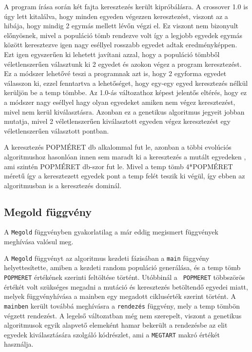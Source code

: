 \documentclass[12pt,a4paper,oneside]{report}
\begin{document}
            A program írása során két fajta keresztezés került kipróbálásra.
            A crossover 1.0 is úgy lett kitalálva, hogy minden egyeden végezzen keresztezést, viszont az a hibája, hogy mindig 2 egymás mellett lévőn végzi el.
            Ez viszont nem bizonyult előnyösnek, mivel a populáció tömb rendezve volt így a legjobb egyedek egymás között keresztezve igen nagy eséllyel rosszabb egyedet adtak eredményképpen.
            Ezt igen egyszerűen ki lehetett javítani azzal, hogy a populáció tömbből véletlenszerűen választunk ki 2 egyedet és azokon végez a program keresztezést.
            Ez a módszer lehetővé teszi a programnak azt is, hogy 2 egyforma egyedet válasszon ki, ezzel fenntartva a lehetőséget, hogy egy-egy egyed keresztezés nélkül kerüljön be a temp tömbbe.
            Az 1.0-ás változathoz képest jelentős eltérés, hogy ez a módszer nagy eséllyel hagy olyan egyedeket amiken nem végez keresztezést, mivel nem kerül kiválasztásra.
            Azonban ez a genetikus algoritmus jegyeit jobban mutatja, mivel 2 véletlenszerűen kiválasztott egyeden végez keresztezést egy véletlenszerűen választott pontban.
            
            
            A keresztezés POPMÉRET db alkalommal fut le, azonban a többi evolúciós algoritmushoz hasonlóan innen sem maradt ki a keresztezés a mutált egyedeken , ami szintén POPMÉRET db-szor fut le.
            Mivel a temp tömb 4*POPMÉRET méretű így a keresztezett egyedek pont a temp felét teszik ki végül, így ebben az algoritmusban is a keresztezés dominál.

        \subsection{Megold függvény} %
            	A \texttt{Megold} függvényben gyakorlatilag a már eddig megismert függvények meghívása valósul meg.
	
	A \texttt{Megold} függvényt az algoritmus kezdeti fázisában a  \texttt{main} függvény helyettesítette, amiben a kezdeti random populáció generálása, és a temp tömb\texttt{ POPMERET} értékének szerinti feltöltése történt. Utóbbinál a \texttt{ POPMERET} többszörös értékét volt szükséges megadni a mutáció és keresztezés betöltendő egyedei miatt, melyek függvényhívása a mainben egy megadott ciklusérték szerint történt. A  \texttt{mainben} került továbbá meghívásra a \texttt{rendezés} függvény, mely a temp tömbön végzett rendezést. A legelső változatban még nem szerepelt, viszont a genetikus algoritmusok egyik alapvető elemeként hamar bekerült a rendezésbe az elit egyedek kiválasztására szolgáló kódrészlet, ami a \texttt{MEGTART} makró értékét használja.
\end{document}
